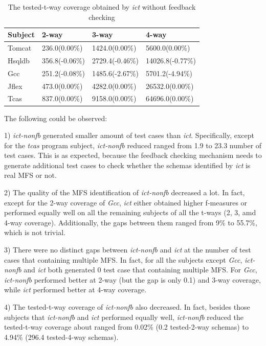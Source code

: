 \documentclass[10pt,journal,compsoc]{IEEEtran}
\begin{document}
{\begin{table}[ht]
\caption{The tested-t-way coverage obtained by \emph{ict} without feedback checking}
\label{tested-t-way-ict-nonfb}
\centering
    \begin{tabular}{|l|l|l|l|}
    \hline
 Subject      & 2-way                     & 3-way                     & 4-way                       \\ \hline
Tomcat	&236.0(0.00\%)	&1424.0(0.00\%)	&5600.0(0.00\%)	\\
Hsqldb	&356.8(-0.06\%)	&2729.4(-0.46\%)	&14026.8(-0.77\%)	\\
Gcc	&251.2(-0.08\%)	&1485.6(-2.67\%)	&5701.2(-4.94\%)	\\
Jflex	&473.0(0.00\%)	&4282.0(0.00\%)	&26532.0(0.00\%)	\\
Tcas	&837.0(0.00\%)	&9158.0(0.00\%)	&64696.0(0.00\%)	\\\hline
    \end{tabular}
\end{table}

The following could be observed:

1) \emph{ict-nonfb} generated smaller amount of test cases than \emph{ict}. Specifically, except for the \emph{tcas} program subject, \emph{ict-nonfb} reduced ranged from 1.9 to 23.3 number of test cases. This is as expected, because the feedback checking mechanism needs to generate additional test cases to check whether the schemas identified by \emph{ict} is real MFS or not.

2) The quality of the MFS identification of \emph{ict-nonfb} decreased a lot. In fact, except for the 2-way coverage of \emph{Gcc}, \emph{ict} either obtained higher f-measures or performed equally well on all the remaining subjects of all the t-ways (2, 3, amd 4-way coverage). Additionally, the gaps between them ranged from 9\% to 55.7\%, which is not trivial.


3) There were no distinct gaps between \emph{ict-nonfb} and \emph{ict} at the number of test cases that containing multiple MFS. In fact, for all the subjects except \emph{Gcc}, \emph{ict-nonfb} and \emph{ict} both generated 0 test case that containing multiple MFS. For \emph{Gcc}, \emph{ict-nonfb} performed better at 2-way (but the gap is only 0.1) and 3-way coverage, while \emph{ict} performed better at 4-way coverage.

4) The tested-t-way coverage of \emph{ict-nonfb} also decreased. In fact, besides those subjects that \emph{ict-nonfb} and \emph{ict} performed equally well, \emph{ict-nonfb} reduced the tested-t-way coverage about ranged from 0.02\% (0.2 tested-2-way schemas) to 4.94\% (296.4 tested-4-way schemas).

}
\end{document}
